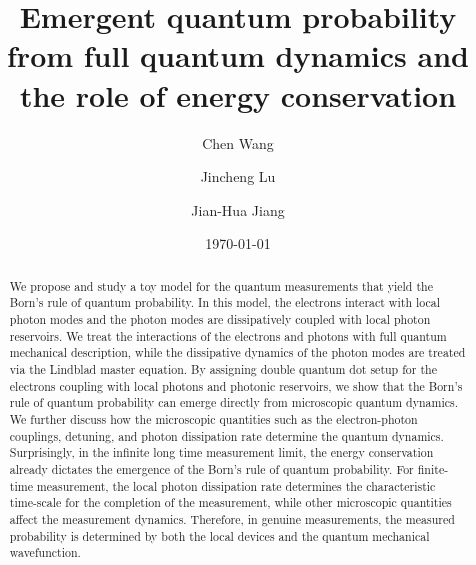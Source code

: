 \documentclass[twocolumn,showpacs,preprintnumbers,amsmath,amssymb]{revtex4}
\begin{document}
	
	
	\title{Emergent quantum probability from full quantum dynamics and the role of energy conservation}
	
	\author{Chen Wang}
    \author{Jincheng Lu}
	\author{Jian-Hua Jiang}
	
	
	\date{\today}
	
	
	\begin{abstract}
We propose and study a toy model for the quantum measurements that yield the Born's rule of quantum probability. In this model, the electrons interact with local photon modes and the photon modes are dissipatively coupled with local photon reservoirs. We treat the interactions of the electrons and photons with full quantum mechanical description, while the dissipative dynamics of the photon modes are treated via the Lindblad master equation. By assigning double quantum dot setup for the electrons coupling with local photons and photonic reservoirs, we show that the Born's rule of quantum probability can emerge directly from microscopic quantum dynamics. We further discuss how the microscopic quantities such as the electron-photon couplings, detuning, and photon dissipation rate determine the quantum dynamics. Surprisingly, in the infinite long time measurement limit, the energy conservation already dictates the emergence of the Born's rule of quantum probability. For finite-time measurement, the local photon dissipation rate determines the characteristic time-scale for the completion of the measurement, while other microscopic quantities affect the measurement dynamics. Therefore, in genuine measurements, the measured probability is determined by both the local devices and the quantum mechanical wavefunction.	\end{abstract}

	\maketitle
	
\end{document}
